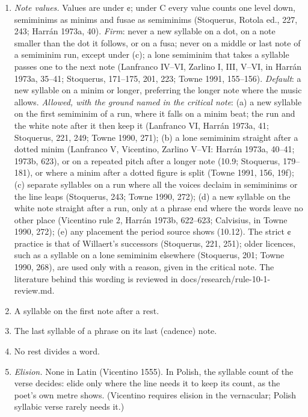\begin{enumerate}

\tightlist
\item
  \textit{Note values.} Values are under ¢; under C every value counts one level down, semiminims as minims and fusae as semiminims (Stoquerus, Rotola ed., 227, 243; Harrán 1973a, 40). \emph{Firm}: never a new syllable on a dot, on a note smaller than the dot it follows, or on a fusa; never on a middle or last note of a semiminim run, except under (c); a lone semiminim that takes a syllable passes one to the next note (Lanfranco IV--VI, Zarlino I, III, V--VI, in Harrán 1973a, 35--41; Stoquerus, 171--175, 201, 223; Towne 1991, 155--156). \emph{Default}: a new syllable on a minim or longer, preferring the longer note where the music allows. \emph{Allowed, with the ground named in the critical note}: (a) a new syllable on the first semiminim of a run, where it falls on a minim beat; the run and the white note after it then keep it (Lanfranco VI, Harrán 1973a, 41; Stoquerus, 221, 249; Towne 1990, 271); (b) a lone semiminim straight after a dotted minim (Lanfranco V, Vicentino, Zarlino V--VI: Harrán 1973a, 40--41; 1973b, 623), or on a repeated pitch after a longer note (10.9; Stoquerus, 179--181), or where a minim after a dotted figure is split (Towne 1991, 156, 19f); (c) separate syllables on a run where all the voices declaim in semiminims or the line leaps (Stoquerus, 243; Towne 1990, 272); (d) a new syllable on the white note straight after a run, only at a phrase end where the words leave no other place (Vicentino rule 2, Harrán 1973b, 622--623; Calvisius, in Towne 1990, 272); (e) any placement the period source shows (10.12). The strict ¢ practice is that of Willaert's successors (Stoquerus, 221, 251); older licences, such as a syllable on a lone semiminim elsewhere (Stoquerus, 201; Towne 1990, 268), are used only with a reason, given in the critical note. The literature behind this wording is reviewed in docs/research/rule-10-1-review.md.
\item
  A syllable on the first note after a rest.
\item
  The last syllable of a phrase on its last (cadence) note.
\item
  No rest divides a word.
\item
  \textit{Elision.} None in Latin (Vicentino 1555). In Polish, the syllable count of the verse decides: elide only where the line needs it to keep its count, as the poet's own metre shows. (Vicentino requires elision in the vernacular; Polish syllabic verse rarely needs it.)
\end{enumerate}

